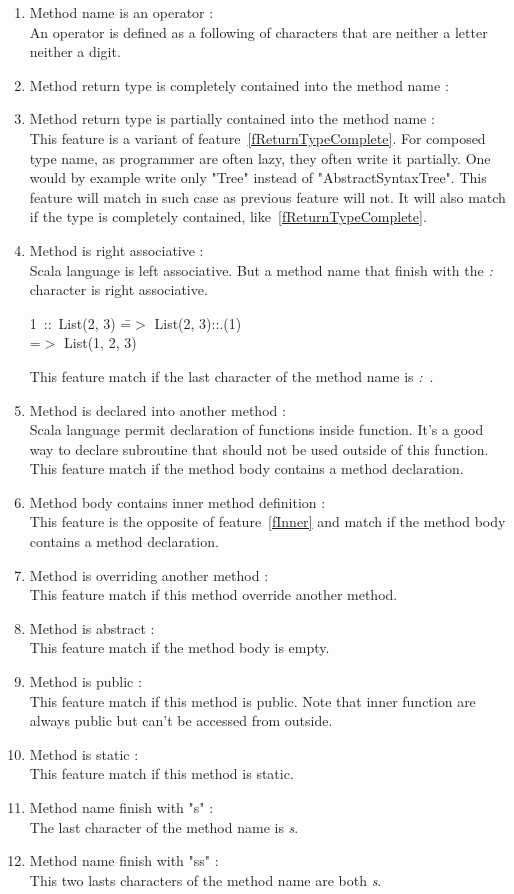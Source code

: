 \documentclass[12pt]{article}
\newcommand{\code}[1]{{\fontfamily{phv}\selectfont \small{\begin{tabbing} #1 \end{tabbing}}}}
\begin{document}
\begin{enumerate}
\item Method name is an operator :\\
	An operator is defined as a following of characters that are neither a letter neither a digit.
\item Method return type is completely contained into the method name :
\item Method return type is partially contained into the method name :\label{fReturnTypeComplete}\\
	This feature is a variant of feature~\ref{fReturnTypeComplete}. For composed type name, as programmer are often lazy, they often write it partially. One would by example write only "Tree" instead of "AbstractSyntaxTree". This feature will match in such case as previous feature will not. It will also match if the type is completely contained, like~\ref{fReturnTypeComplete}.
\item Method is right associative :\\
	Scala language is left associative. But a method name that finish with the \textit{:} character is right associative.
\code{
1\ ::\ List(2, 3) \==$>$ List(2, 3)::.(1)\\
\>=$>$ List(1, 2, 3)
}
This feature match if the last character of the method name is \textit{:}\ .
\item Method is declared into another method :\label{fInner}\\
	Scala language permit declaration of functions inside function. It's a good way to declare subroutine that should not be used outside of this function.\\
This feature match if the method body contains a method declaration.
\item Method body contains inner method definition :\\
	This feature is the opposite of feature~\ref{fInner} and match if the method body contains a method declaration.
\item Method is overriding another method : \\
	This feature match if this method override another method.
\item Method is abstract :\\
	This feature match if the method body is empty.
\item Method is public :\\
	This feature match if this method is public. Note that inner function are always public but can't be accessed from outside.
\item Method is static :\\
	This feature match if this method is static. 
\item Method name finish with "s" :\label{fs}\\
	The last character of the method name is \textit{s}.
\item Method name finish with "ss" : \label{fss} \\
	This two lasts characters of the method name are both \textit{s}.

\end{enumerate}
\end{document}
